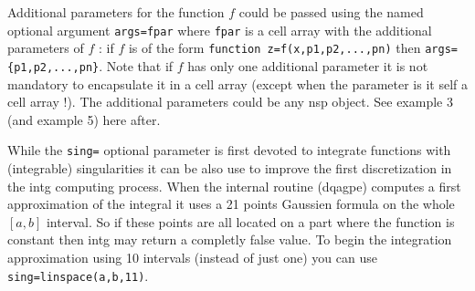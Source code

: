 \begin{mandescription}
Additional parameters for the function $f$ could be passed using the
named optional argument \verb+args=fpar+ where \verb+fpar+ is a 
cell array with the additional parameters of $f$ : if $f$ is of the form 
\verb+function z=f(x,p1,p2,...,pn)+ then \verb+args={p1,p2,...,pn}+. 
Note that if $f$ has only one additional parameter it is not mandatory 
to encapsulate it in a cell array (except when the parameter is it 
self a cell array !). The additional parameters could be any nsp object. 
See example 3 (and example 5) here after. 


While the \verb+sing=+ optional parameter is first devoted to
integrate functions with (integrable) singularities it can
be also use to improve the first discretization in the intg 
computing process. When the internal routine (dqagpe) computes 
a first approximation of the integral it uses a 21 points 
Gaussien formula on the whole $[a,b]$ interval. So if these
points are all located on a part where the function is constant 
then intg may return a completly false value. To begin the 
integration approximation using 10 intervals (instead
of just one) you can use \verb+sing=linspace(a,b,11)+.

\end{mandescription}

